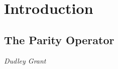 \section{Introduction}


\subsection{The Parity Operator}\label{ParitySection}
\vspace{-1.0em}
\begin{center}
\tiny{\textit{Dudley Grant}}
\end{center}

